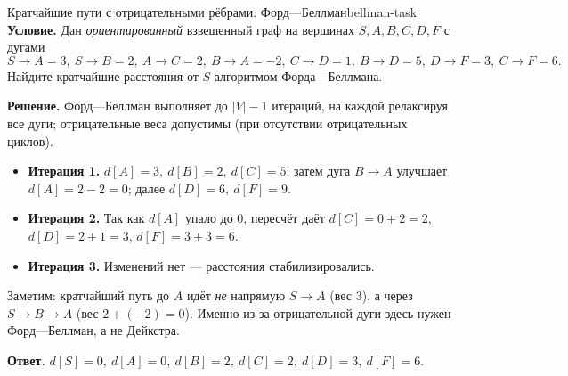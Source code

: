 \begin{task}{Кратчайшие пути с отрицательными рёбрами: Форд—Беллман}{bellman-task}
\textbf{Условие.} Дан \emph{ориентированный} взвешенный граф на вершинах
$S,A,B,C,D,F$ с дугами
\[
  S\!\to\!A=3,\ S\!\to\!B=2,\ A\!\to\!C=2,\ B\!\to\!A=-2,\
  C\!\to\!D=1,\ B\!\to\!D=5,\ D\!\to\!F=3,\ C\!\to\!F=6.
\]
Найдите кратчайшие расстояния от $S$ алгоритмом Форда—Беллмана.

\smallskip
{}

\textbf{Решение.} Форд—Беллман выполняет до $|V|-1$ итераций, на каждой
релаксируя все дуги; отрицательные веса допустимы (при отсутствии отрицательных
циклов).
\begin{itemize}
  \item \textbf{Итерация 1.} $d[A]=3,\ d[B]=2,\ d[C]=5$; затем дуга
        $B\!\to\!A$ улучшает $d[A]=2-2=0$; далее $d[D]=6,\ d[F]=9$.
  \item \textbf{Итерация 2.} Так как $d[A]$ упало до $0$, пересчёт даёт
        $d[C]=0+2=2$, $d[D]=2+1=3$, $d[F]=3+3=6$.
  \item \textbf{Итерация 3.} Изменений нет --- расстояния стабилизировались.
\end{itemize}
Заметим: кратчайший путь до $A$ идёт \emph{не} напрямую $S\!\to\!A$ (вес $3$),
а через $S\!\to\!B\!\to\!A$ (вес $2+(-2)=0$). Именно из-за отрицательной дуги
здесь нужен Форд—Беллман, а не Дейкстра.


\textbf{Ответ.} $d[S]=0,\ d[A]=0,\ d[B]=2,\ d[C]=2,\ d[D]=3,\ d[F]=6$.
\end{task}
